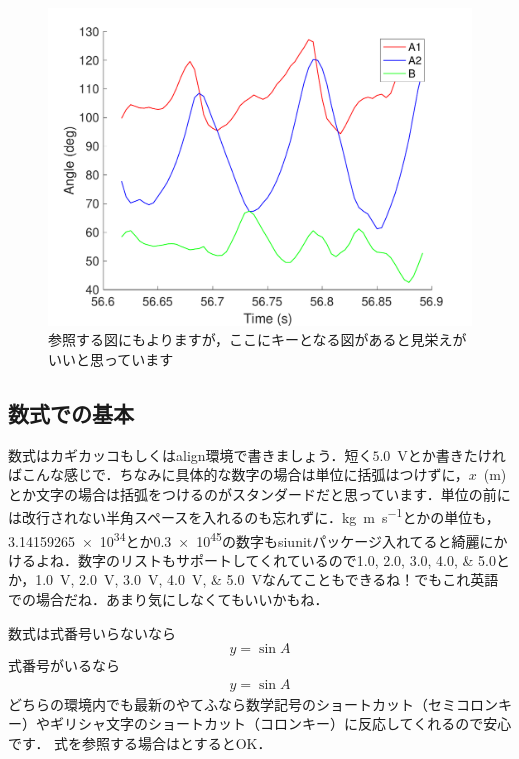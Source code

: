 \documentclass[platex,dvipdfmx]{jlreq}%
\numberwithin{equation}{section}%
\begin{document}
\begin{figure}[tb]
 \centering %
  \includegraphics[width=\columnwidth]{./figure/testfig.pdf}
  \caption{参照する図にもよりますが，ここにキーとなる図があると見栄えがいいと思っています}
  \label{fig:test}
\end{figure}

\subsection{数式での基本}

数式はカギカッコもしくはalign環境で書きましょう．短く$5.0$~Vとか書きたければこんな感じで．ちなみに具体的な数字の場合は単位に括弧はつけずに，$x$~(m)とか文字の場合は括弧をつけるのがスタンダードだと思っています．単位の前には改行されない半角スペースを入れるのも忘れずに．\si{kg.m.s^{-1}}とかの単位も，\num{3.14159265e34}とか\num{.3e45}の数字もsiunitパッケージ入れてると綺麗にかけるよね．数字のリストもサポートしてくれているので\numlist{ 1.0; 2.0; 3.0; 4.0; 5.0}とか，\SIlist{ 1.0; 2.0; 3.0; 4.0; 5.0}{\volt}なんてこともできるね！でもこれ英語での場合だね．あまり気にしなくてもいいかもね．

数式は式番号いらないなら
\[
 y=\sin{A}
\] 
式番号がいるなら
\begin{align}
 y=\sin{A}
 \label{eq:test}
\end{align}
どちらの環境内でも最新のやてふなら数学記号のショートカット（セミコロンキー）やギリシャ文字のショートカット（コロンキー）に反応してくれるので安心です．
式を参照する場合はとするとOK．
\end{document}
